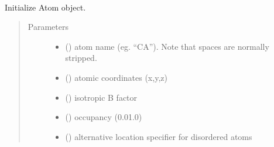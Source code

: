 \documentclass[a4paper,10pt,english,openany,oneside]{sphinxmanual}
\begin{document}
\begin{fulllineitems}
\label{\detokenize{reference/generated/paramagpy.protein.CustomAtom:paramagpy.protein.CustomAtom}}~

\begin{fulllineitems}
\label{\detokenize{reference/generated/paramagpy.protein.CustomAtom:paramagpy.protein.CustomAtom.__init__}}
\sphinxAtStartPar
Initialize Atom object.
\begin{quote}\begin{description}
\item[{Parameters}] \leavevmode\begin{itemize}
\item {} 
\sphinxAtStartPar
{} () \textendash{} atom name (eg. “CA”). Note that spaces are normally stripped.

\item {} 
\sphinxAtStartPar
{} (\sphinxstyleliteralemphasis{\sphinxupquote{ (}}\sphinxstyleliteralemphasis{\sphinxupquote{, }}\sphinxstyleliteralemphasis{\sphinxupquote{)}}) \textendash{} atomic coordinates (x,y,z)

\item {} 
\sphinxAtStartPar
{} () \textendash{} isotropic B factor

\item {} 
\sphinxAtStartPar
{} () \textendash{} occupancy (0.0\sphinxhyphen{}1.0)

\item {} 
\sphinxAtStartPar
{} () \textendash{} alternative location specifier for disordered atoms


\end{itemize}
\end{description}
\end{quote}
\end{fulllineitems}
\end{fulllineitems}
\end{document}
